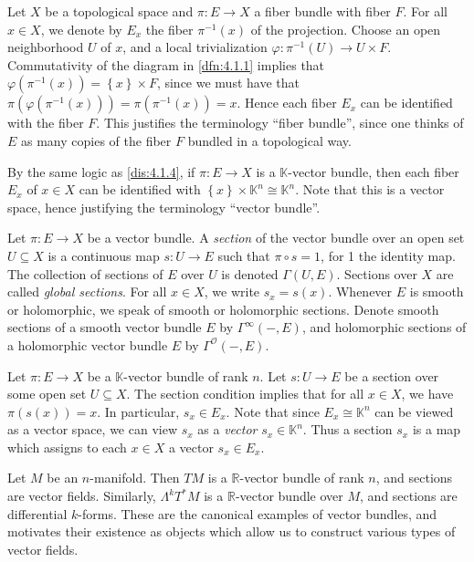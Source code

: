 \begin{discussion}\label{dis:4.1.4}
	Let $X$ be a topological space and $\pi : E \to X$ a fiber bundle with fiber $F$. For all $x\in X$, we denote by $E_x$ the fiber $\pi ^{-1} (x)$ of the projection. Choose an open neighborhood $U$ of $x$, and a local trivialization $\varphi : \pi^{-1} (U) \to U\times F$. Commutativity of the diagram in \cref{dfn:4.1.1} implies that $\varphi (\pi ^{-1} (x))=\left\{ x \right\} \times F$, since we must have that $\pi (\varphi (\pi ^{-1} (x))) = \pi (\pi ^{-1} (x))=x$. Hence each fiber $E_x$ can be identified with the fiber $F$. This justifies the terminology ``fiber bundle'', since one thinks of $E$ as many copies of the fiber $F$ bundled in a topological way.
\end{discussion}
\begin{discussion}\label{dis:4.1.5}
	By the same logic as \cref{dis:4.1.4}, if $\pi : E \to X$ is a $\mathbb{K} $-vector bundle, then each fiber $E_x$ of $x\in X$ can be identified with $\left\{ x \right\} \times \mathbb{K} ^n \cong \mathbb{K} ^n$. Note that this is a vector space, hence justifying the terminology ``vector bundle''.
\end{discussion}
\begin{definition}\label{dfn:4.1.6}
	Let $\pi : E \to X$ be a vector bundle. A \emph{section} of the vector bundle over an open set $U\subseteq X$ is a continuous map $s : U \to E$ such that $\pi \circ s = 1$, for 1 the identity map. The collection of sections of $E$ over $U$ is denoted $\Gamma (U,E)$. Sections over $X$ are called \emph{global sections}. For all $x\in X$, we write $s_x=s(x)$. Whenever $E$ is smooth or holomorphic, we speak of smooth or holomorphic sections. Denote smooth sections of a smooth vector bundle $E$ by $\Gamma ^\infty (-,E)$, and holomorphic sections of a holomorphic vector bundle $E$ by $\Gamma ^\mathcal{O} (-,E)$.
\end{definition}
\begin{discussion}\label{dis:4.1.7}
	Let $\pi : E \to X$ be a $\mathbb{K} $-vector bundle of rank $n$. Let $s : U \to E$ be a section over some open set $U\subseteq X$. The section condition implies that for all $x\in X$, we have $\pi (s(x))=x$. In particular, $s_x\in E_x$. Note that since $E_x \cong \mathbb{K} ^n$ can be viewed as a vector space, we can view $s_x$ as a \emph{vector} $s_x\in\mathbb{K} ^n$. Thus a section $s_x$ is a map which assigns to each $x\in X$ a vector $s_x\in E_x$.
\end{discussion}
\begin{example}\label{ex:4.1.8}
	Let $M$ be an $n$-manifold. Then $TM$ is a $\mathbb{R} $-vector bundle of rank $n$, and sections are vector fields. Similarly, $\Lambda ^kT^*M$ is a $\mathbb{R} $-vector bundle over $M$, and sections are differential $k$-forms. These are the canonical examples of vector bundles, and motivates their existence as objects which allow us to construct various types of vector fields.
\end{example}

